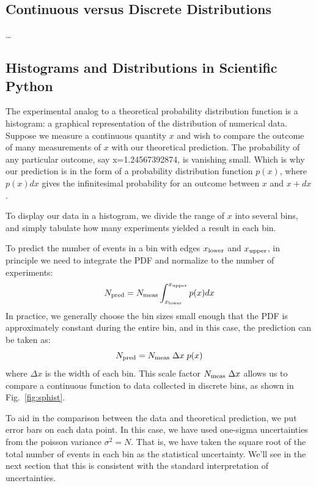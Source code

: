\documentclass[12pt]{article}
\begin{document}
\subsection{Continuous versus Discrete Distributions}

\ldots

\subsection{Histograms and Distributions in Scientific Python}

The experimental analog to a theoretical probability distribution function is a histogram:  a graphical representation of the distribution of numerical data.  Suppose we measure a continuous quantity $x$ and wish to compare the outcome of many measurements of $x$ with our theoretical prediction.  The probability of any  particular outcome, say x=1.24567392874, is vanishing small.  Which is why our prediction is in the form of a probability distribution function $p(x)$, where $p(x) dx$ gives the infinitesimal probability for an outcome between $x$ and $x+dx$.

To display our data in a histogram, we divide the range of $x$ into several bins, and simply tabulate how many experiments yielded a result in each bin.

To predict the number of events in a bin with edges $x_{\rm lower}$ and $x_{\rm upper}$, in principle we need to integrate the PDF and normalize to the number of experiments:
\begin{displaymath}
N_{\rm pred} = N_{\rm meas} \int^{x_{\rm upper}}_{x_{\rm lower}} p(x) dx
\end{displaymath}
In practice, we generally choose the bin sizes small enough that the PDF is approximately constant during the entire bin, and in this case, the prediction can be taken as:
\begin{displaymath}
N_{\rm pred} = N_{\rm meas} \; \Delta x \; p(x)
\end{displaymath}
where $\Delta x$ is the width of each bin.  This scale factor $N_{\rm meas} \; \Delta x$ allows us to compare a continuous function to data collected in discrete bins, as shown in Fig.~\ref{fig:sphist}.

To aid in the comparison between the data and theoretical prediction, we put error bars on each data point.  In this case, we have used one-sigma uncertainties from the poisson variance $\sigma^2 = N$.  That is, we have taken the square root of the total number of events in each bin as the statistical uncertainty.  We'll see in the next section that this is consistent with the standard interpretation of uncertainties.
\end{document}
